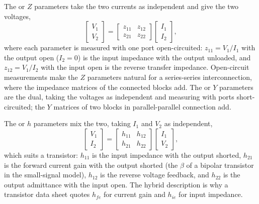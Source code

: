 The  or $Z$ parameters take the two currents as
independent and give the two voltages,
\[
\begin{bmatrix} V_1 \\ V_2 \end{bmatrix}
=
\begin{bmatrix} z_{11} & z_{12} \\ z_{21} & z_{22} \end{bmatrix}
\begin{bmatrix} I_1 \\ I_2 \end{bmatrix},
\]
where each parameter is measured with one port open-circuited:
$z_{11} = V_1/I_1$ with the output open ($I_2 = 0$) is the input
impedance with the output unloaded, and $z_{12} = V_1/I_2$ with the input
open is the reverse transfer impedance. Open-circuit measurements make the
$Z$ parameters natural for a series-series interconnection, where the
impedance matrices of the connected blocks add. The 
or $Y$ parameters are the dual, taking the voltages as independent and
measuring with ports short-circuited; the $Y$ matrices of two blocks in
parallel-parallel connection add.

The  or $h$ parameters mix the two, taking $I_1$ and $V_2$
as independent,
\[
\begin{bmatrix} V_1 \\ I_2 \end{bmatrix}
=
\begin{bmatrix} h_{11} & h_{12} \\ h_{21} & h_{22} \end{bmatrix}
\begin{bmatrix} I_1 \\ V_2 \end{bmatrix},
\]
which suits a transistor: $h_{11}$ is the input impedance with the output
shorted, $h_{21}$ is the forward current gain with the output shorted (the
$\beta$ of a bipolar transistor in the small-signal model), $h_{12}$ is
the reverse voltage feedback, and $h_{22}$ is the output admittance with
the input open. The hybrid description is why a transistor data sheet
quotes $h_{fe}$ for current gain and $h_{ie}$ for input impedance.


